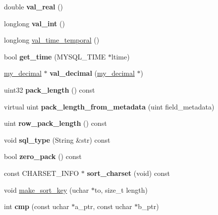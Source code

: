 \begin{DoxyCompactItemize}
\item 
\mbox{\label{classField__timef_afe971c9ea8ef709187ff3db21280a644}} 
double {\bfseries val\+\_\+real} ()
\item 
\mbox{\label{classField__timef_a0406616122503d67fd4d5de9c8be9484}} 
longlong {\bfseries val\+\_\+int} ()
\item 
longlong \mbox{\hyperlink{classField__timef_a03db4df3722b7e0292b84b982de342e3}{val\+\_\+time\+\_\+temporal}} ()
\item 
\mbox{\label{classField__timef_a1a14617a49aa7f281dc32df631f8e740}} 
bool {\bfseries get\+\_\+time} (M\+Y\+S\+Q\+L\+\_\+\+T\+I\+ME $\ast$ltime)
\item 
\mbox{\label{classField__timef_a13999680393a7e55a321b1f06aee4ea1}} 
\mbox{\hyperlink{classmy__decimal}{my\+\_\+decimal}} $\ast$ {\bfseries val\+\_\+decimal} (\mbox{\hyperlink{classmy__decimal}{my\+\_\+decimal}} $\ast$)
\item 
\mbox{\label{classField__timef_ad5e1d63aee3f3af0f11af214836fed66}} 
uint32 {\bfseries pack\+\_\+length} () const
\item 
\mbox{\label{classField__timef_a5dcc1aac87fdc184ff0c33af4c27c292}} 
virtual uint {\bfseries pack\+\_\+length\+\_\+from\+\_\+metadata} (uint field\+\_\+metadata)
\item 
\mbox{\label{classField__timef_ad12feff45400eafc7594107594926b9c}} 
uint {\bfseries row\+\_\+pack\+\_\+length} () const
\item 
\mbox{\label{classField__timef_a46b2570e0b597d4818b5af5e32cde73b}} 
void {\bfseries sql\+\_\+type} (String \&str) const
\item 
\mbox{\label{classField__timef_ad2d3152f410135b590081ebdcb1263cb}} 
bool {\bfseries zero\+\_\+pack} () const
\item 
\mbox{\label{classField__timef_aed776558f1922cb509778a0989d71e19}} 
const C\+H\+A\+R\+S\+E\+T\+\_\+\+I\+N\+FO $\ast$ {\bfseries sort\+\_\+charset} (void) const
\item 
void \mbox{\hyperlink{classField__timef_a44d73ae1b0cb65c1f269a5a2c60acb29}{make\+\_\+sort\+\_\+key}} (uchar $\ast$to, size\+\_\+t length)
\item 
\mbox{\label{classField__timef_abcf446be45c04e502639ce1032528a27}} 
int {\bfseries cmp} (const uchar $\ast$a\+\_\+ptr, const uchar $\ast$b\+\_\+ptr)
\end{DoxyCompactItemize}
